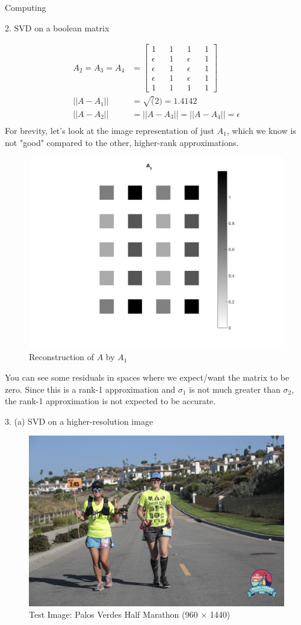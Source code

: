 \begin{section}{Computing}
\begin{homeworkSection}{2. SVD on a boolean matrix}
{\begin{align*}
        A_2 = A_3 = A_4 &= \begin{bmatrix} 1 && 1 && 1 && 1\\ 
        \epsilon && 1 && \epsilon && 1\\ 
        \epsilon && 1 && \epsilon && 1\\ 
        \epsilon && 1 && \epsilon && 1\\ 
        1 && 1 && 1 && 1\end{bmatrix} \\ 
        ||A- A_1|| &= \sqrt(2) = 1.4142 \\
        ||A- A_2|| &=  ||A- A_3|| = ||A- A_4|| = \epsilon \\
    \end{align*}
    For brevity, let's look at the image representation of just $A_1$, which we know is not "good" compared to the other, higher-rank approximations.
    \begin{figure}[H]
    \centering
    \includegraphics[width=0.35\columnwidth]{../data/Prob2_1}
    \caption{Reconstruction of $A$ by $A_1$}
    \label{fig:p2_1}
    \end{figure}
    You can see some residuals in spaces where we expect/want the matrix to be zero. Since this is a rank-1 approximation and $\sigma_1$ is not much greater than $\sigma_2$, the rank-1 approximation is not expected to be accurate.
}
\end{homeworkSection}


\begin{homeworkSection}{3. (a) SVD on a higher-resolution image}

\begin{figure}[H]
\centering
\includegraphics[width=0.95\columnwidth]{../data/testim}
\caption{Test Image: Palos Verdes Half Marathon (960 $\times$ 1440)}
\label{fig:myim}
\end{figure}


\end{homeworkSection}
\end{section}
